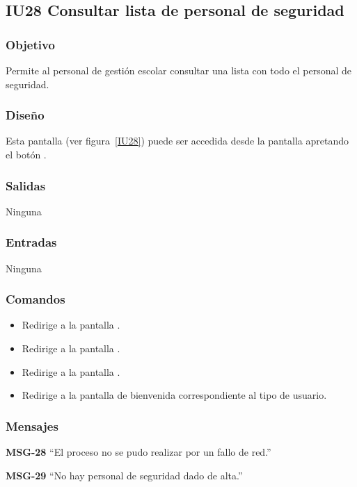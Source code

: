 
\subsection{IU28 Consultar lista de personal de seguridad}
\subsubsection{Objetivo}
   Permite al personal de gestión escolar consultar una lista con todo el personal de seguridad.
\subsubsection{Diseño}
    Esta pantalla  (ver figura~\ref{IU28}) puede ser accedida desde la pantalla  apretando el botón .

\subsubsection{Salidas}
Ninguna
\subsubsection{Entradas}
Ninguna
\subsubsection{Comandos}
\begin{itemize}
    \item {} Redirige a la pantalla .
    \item {} Redirige a la pantalla .
    \item {} Redirige a la pantalla .
    \item {} Redirige a la pantalla de bienvenida correspondiente al tipo de usuario.
    
\end{itemize}

\subsubsection{Mensajes}

\begin{Citemize}
    \item {\bf MSG-28}  ``El proceso no se pudo realizar por un fallo de red.''
    \item {\bf MSG-29}  ``No hay personal de seguridad dado de alta.''
    
\end{Citemize}


